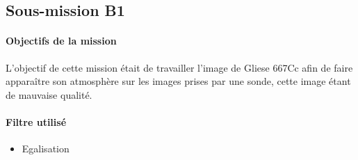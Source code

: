 \documentclass[12pt]{article}
\begin{document}
	\subsection{Sous-mission B1}

	\begin{vwcol}[widths={0.8,0.2}, rule=0pt]
	\begin{minipage}{0.7\textwidth}
	\paragraph{Objectifs de la mission}

	L'objectif de cette mission était de travailler l'image de Gliese 667Cc afin de faire apparaître son atmosphère sur les images prises par une sonde, cette image étant de mauvaise qualité. 
	\end{minipage}
	\begin{minipage}{0.2\textwidth}
	\paragraph{Filtre utilisé}

	\begin{itemize}
		\item Egalisation
	\end{itemize}
	\end{minipage}
	\end{vwcol} 
\end{document}
